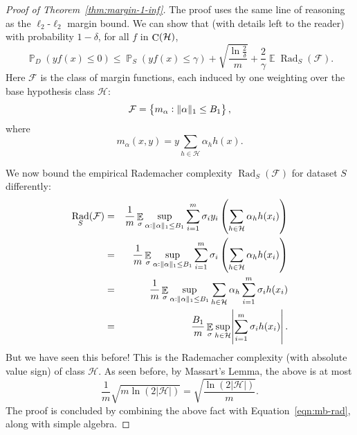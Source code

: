 \documentclass{article}
\DeclareMathOperator{\Rad}{{\mathrm{Rad}}}
\DeclareMathOperator*{\C}{{\rm C}}
\DeclareMathOperator{\EE}{{\mathbb E}}
\DeclareMathOperator{\PP}{{\mathbb P}}
\newcommand{\Hcal}{\mathcal{H}}
\newcommand{\Fcal}{\mathcal{F}}
\begin{document}






\begin{proof}[Proof of Theorem~\ref{thm:margin-1-inf}]
The proof uses the same line of reasoning as the $\ell_2$-$\ell_2$ margin bound. We can show that (with details left to the reader) with probability $1-\delta$, for all $f$ in $\C(\Hcal)$,
\begin{equation}
  \PP_D(y f(x) \leq 0) \leq \PP_S(y f(x) \leq \gamma) +
\sqrt{\frac{\ln\frac{2}{\delta}}{m}} + \frac{2}{\gamma} \EE \Rad_S(\Fcal).
\label{eqn:mb-rad}
\end{equation}
Here $\Fcal$ is the class of margin functions, each induced by one weighting over the base hypothesis class $\Hcal$:
\[ \Fcal = \cbr{m_\alpha: \|\alpha\|_1 \leq B_1}, \]
where
\[ m_\alpha(x,y) = y \sum_{h \in \Hcal} \alpha_h h(x). \]

We now bound the empirical Rademacher complexity $\Rad_S(\Fcal)$ for dataset $S$ differently:
\begin{eqnarray*}
\Rad_S(\Fcal)
&=& \frac1m \EE_\sigma \sup_{\alpha: \|\alpha\|_1 \leq B_1} \sum_{i=1}^m \sigma_i y_i \del{\sum_{h \in \Hcal} \alpha_h h(x_i)} \\
&=& \frac1m \EE_\sigma \sup_{\alpha: \|\alpha\|_1 \leq B_1} \sum_{i=1}^m \sigma_i \del{\sum_{h \in \Hcal} \alpha_h h(x_i)} \\
&=& \frac1m \EE_\sigma \sup_{\alpha: \|\alpha\|_1 \leq B_1} \sum_{h \in \Hcal} \alpha_h \sum_{i=1}^m \sigma_i h(x_i) \\
&=& \frac{B_1}m \EE_\sigma \sup_{h \in \Hcal} \abs{\sum_{i=1}^m \sigma_i h(x_i)}.
\end{eqnarray*}
But we have seen this before! This is the Rademacher complexity (with absolute value sign) of class $\Hcal$. As seen before, by Massart's Lemma, the above is at most
\[ \frac1m \sqrt{m \ln(2|\Hcal|)} = \sqrt{\frac{\ln(2|\Hcal|)}m}. \]
The proof is concluded by combining the above fact with Equation~\eqref{eqn:mb-rad}, along with simple algebra.
\end{proof}



\end{document}
